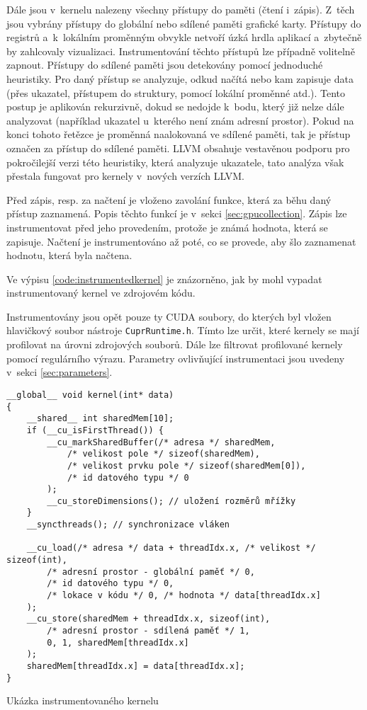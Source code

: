 Dále jsou v~kernelu nalezeny všechny přístupy do paměti (čtení i~zápis). Z~těch jsou vybrány přístupy do globální nebo sdílené paměti grafické karty. Přístupy do registrů a~k~lokálním proměnným obvykle netvoří úzká hrdla aplikací a~zbytečně by zahlcovaly vizualizaci. Instrumentování těchto přístupů lze případně volitelně zapnout. Přístupy do sdílené paměti jsou detekovány pomocí jednoduché heuristiky. Pro daný přístup se analyzuje, odkud načítá nebo kam zapisuje data (přes ukazatel, přístupem do struktury, pomocí lokální proměnné atd.). Tento postup je aplikován rekurzivně, dokud se nedojde k~bodu, který již nelze dále analyzovat (například ukazatel u~kterého není znám adresní prostor). Pokud na konci tohoto řetězce je proměnná naalokovaná ve sdílené paměti, tak je přístup označen za přístup do sdílené paměti. LLVM obsahuje vestavěnou podporu pro pokročilejší verzi této heuristiky, která analyzuje ukazatele, tato analýza však přestala fungovat pro kernely v~nových verzích LLVM.

Před zápis, resp. za načtení je vloženo zavolání funkce, která za běhu daný přístup zaznamená. Popis těchto funkcí je v~sekci \ref{sec:gpucollection}. Zápis lze instrumentovat před jeho provedením, protože je známá hodnota, která se zapisuje. Načtení je instrumentováno až poté, co se provede, aby šlo zaznamenat hodnotu, která byla načtena.

Ve výpisu \ref{code:instrumentedkernel} je znázorněno, jak by mohl vypadat instrumentovaný kernel ve zdrojovém kódu.
    
Instrumentovány jsou opět pouze ty CUDA soubory, do kterých byl vložen hlavičkový soubor nástroje \texttt{CuprRuntime.h}. Tímto lze určit, které kernely se mají profilovat na úrovni zdrojových souborů. Dále lze filtrovat profilované kernely pomocí regulárního výrazu. Parametry ovlivňující instrumentaci jsou uvedeny v~sekci \ref{sec:parameters}.

\begin{listing}
\begin{verbatim}
__global__ void kernel(int* data)
{
    __shared__ int sharedMem[10];
    if (__cu_isFirstThread()) {
        __cu_markSharedBuffer(/* adresa */ sharedMem,
            /* velikost pole */ sizeof(sharedMem),
            /* velikost prvku pole */ sizeof(sharedMem[0]),
            /* id datového typu */ 0
        );
        __cu_storeDimensions(); // uložení rozměrů mřížky
    }
    __syncthreads(); // synchronizace vláken
    
    __cu_load(/* adresa */ data + threadIdx.x, /* velikost */ sizeof(int),
        /* adresní prostor - globální paměť */ 0,
        /* id datového typu */ 0,
        /* lokace v kódu */ 0, /* hodnota */ data[threadIdx.x]
    );
    __cu_store(sharedMem + threadIdx.x, sizeof(int),
        /* adresní prostor - sdílená paměť */ 1,
        0, 1, sharedMem[threadIdx.x]
    );
    sharedMem[threadIdx.x] = data[threadIdx.x];
}
\end{verbatim}
\caption{Ukázka instrumentovaného kernelu}
\label{code:instrumentedkernel}
\end{listing}

